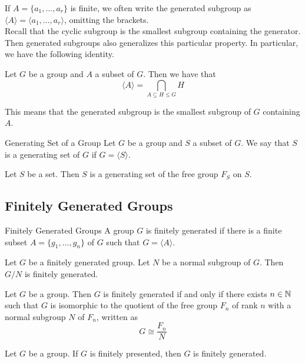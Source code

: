 \documentclass[a4paper]{article}
\begin{document}
If $A=\{a_1,\dots,a_r\}$ is finite, we often write the generated subgroup as $\langle A\rangle=\langle a_1,\dots,a_r\rangle$, omitting the brackets. \\

Recall that the cyclic subgroup is the smallest subgroup containing the generator. Then generated subgroups also generalizes this particular property. In particular, we have the following identity. 

\begin{prp}{}{} Let $G$ be a group and $A$ a subset of $G$. Then we have that $$\langle A\rangle=\bigcap_{A\subseteq H\leq G}H$$
\end{prp}

This means that the generated subgroup is the smallest subgroup of $G$ containing $A$. 

\begin{defn}{Generating Set of a Group}{} Let $G$ be a group and $S$ a subset of $G$. We say that $S$ is a generating set of $G$ if $G=\langle S\rangle$. 
\end{defn}

\begin{lmm}{}{} Let $S$ be a set. Then $S$ is a generating set of the free group $F_S$ on $S$. 
\end{lmm}

\subsection{Finitely Generated Groups}
\begin{defn}{Finitely Generated Groups}{} A group $G$ is finitely generated if there is a finite subset $A=\{g_1,\dots,g_n\}$ of $G$ such that $G=\langle A\rangle$. 
\end{defn}

\begin{prp}{}{} Let $G$ be a finitely generated group. Let $N$ be a normal subgroup of $G$. Then $G/N$ is finitely generated. 
\end{prp}

\begin{prp}{}{} Let $G$ be a group. Then $G$ is finitely generated if and only if there exists $n\in\mathbb{N}$ such that $G$ is isomorphic to the quotient of the free group $F_n$ of rank $n$ with a normal subgroup $N$ of $F_n$, written as $$G\cong\frac{F_n}{N}$$
\end{prp}

\begin{prp}{}{} Let $G$ be a group. If $G$ is finitely presented, then $G$ is finitely generated. 
\end{prp}
\end{document}
